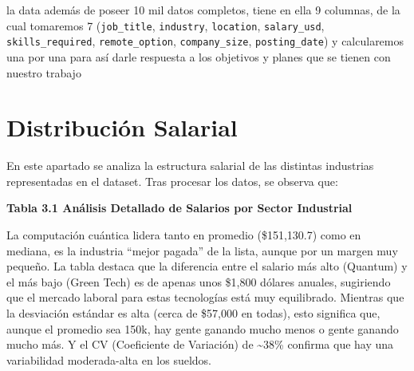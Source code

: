 \documentclass[oneside,11pt]{Latex/Classes/PhDthesisPSnPDF}
\begin{document}
la data además de poseer 10 mil datos completos, tiene en ella 9
columnas, de la cual tomaremos 7 (\texttt{job\_title},
\texttt{industry}, \texttt{location}, \texttt{salary\_usd},
\texttt{skills\_required}, \texttt{remote\_option},
\texttt{company\_size}, \texttt{posting\_date}) y calcularemos una por
una para así darle respuesta a los objetivos y planes que se tienen con
nuestro trabajo

\section{Distribución Salarial}

En este apartado se analiza la estructura salarial de las distintas
industrias representadas en el dataset. Tras procesar los datos, se
observa que:

\begin{center}
\textbf{Tabla 3.1 Análisis Detallado de Salarios por Sector Industrial}
\end{center}

\begin{table}[!h]
\centering
{}
\end{table}

La computación cuántica lidera tanto en promedio (\$151,130.7) como en
mediana, es la industria ``mejor pagada'' de la lista, aunque por un
margen muy pequeño. La tabla destaca que la diferencia entre el salario
más alto (Quantum) y el más bajo (Green Tech) es de apenas unos \$1,800
dólares anuales, sugiriendo que el mercado laboral para estas
tecnologías está muy equilibrado. Mientras que la desviación estándar es
alta (cerca de \$57,000 en todas), esto significa que, aunque el
promedio sea 150k, hay gente ganando mucho menos o gente ganando mucho
más. Y el CV (Coeficiente de Variación) de \textasciitilde38\% confirma
que hay una variabilidad moderada-alta en los sueldos.
\end{document}
